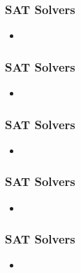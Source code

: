 \documentclass{beamer}
\begin{document}
\begin{frame}

 \frametitle{SAT Solvers}
 
 \begin{itemize}
 
 \item  
 
 \end{itemize}
 
\end{frame}

\begin{frame}

 \frametitle{SAT Solvers}
 
 \begin{itemize}
 
 \item  
 
 \end{itemize}
 
\end{frame}

\begin{frame}

 \frametitle{SAT Solvers}
 
 \begin{itemize}
 
 \item  
 
 \end{itemize}
 
\end{frame}

\begin{frame}

 \frametitle{SAT Solvers}
 
 \begin{itemize}
 
 \item  
 
 \end{itemize}
 
\end{frame}

\begin{frame}

 \frametitle{SAT Solvers}
 
 \begin{itemize}
 
 \item  
 
 \end{itemize}
 
\end{frame}
\end{document}
